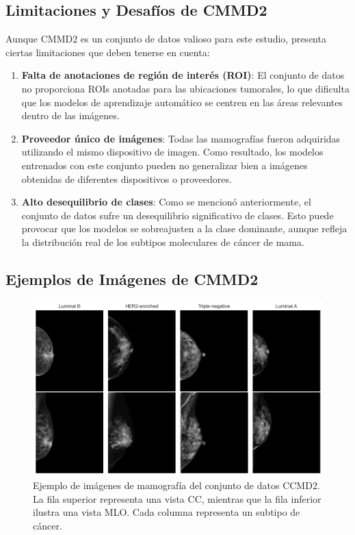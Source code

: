 \documentclass[a4paper,10pt]{book}
\begin{document}
\subsection{Limitaciones y Desafíos de CMMD2}

Aunque CMMD2 es un conjunto de datos valioso para este estudio, presenta ciertas limitaciones que deben tenerse en cuenta:

\begin{enumerate}
\item \textbf{Falta de anotaciones de región de interés (ROI)}: El conjunto de datos no proporciona ROIs anotadas para las ubicaciones tumorales, lo que dificulta que los modelos de aprendizaje automático se centren en las áreas relevantes dentro de las imágenes.
\item \textbf{Proveedor único de imágenes}: Todas las mamografías fueron adquiridas utilizando el mismo dispositivo de imagen. Como resultado, los modelos entrenados con este conjunto pueden no generalizar bien a imágenes obtenidas de diferentes dispositivos o proveedores.
\item \textbf{Alto desequilibrio de clases}: Como se mencionó anteriormente, el conjunto de datos sufre un desequilibrio significativo de clases. Esto puede provocar que los modelos se sobreajusten a la clase dominante, aunque refleja la distribución real de los subtipos moleculares de cáncer de mama.
\end{enumerate}

\subsection{Ejemplos de Imágenes de CMMD2}

\begin{figure}[h!]
\centering
\includegraphics[width=1.0\linewidth]{reports//assets/images_examples.png}
\caption[Ejemplos de imágenes de mamografía de CMMD2]{Ejemplo de imágenes de mamografía del conjunto de datos CCMD2. La fila superior representa una vista CC, mientras que la fila inferior ilustra una vista MLO. Cada columna representa un subtipo de cáncer.}
\label{fig:cmmd-examples}
\end{figure}
\end{document}
